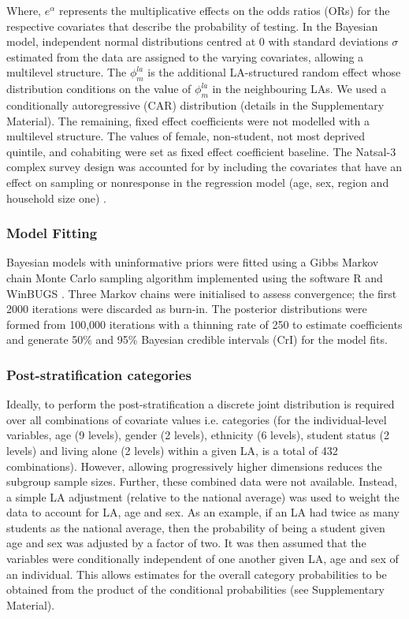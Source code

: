\documentclass[fleqn,10pt]{wlscirep}
\begin{document}
Where, $e^{\alpha}$ represents the multiplicative effects on the odds ratios (ORs) for the respective covariates that describe the probability of testing. In the Bayesian model, independent normal distributions centred at 0 with standard deviations $\sigma$ estimated from the data are assigned to the varying covariates, allowing a multilevel structure. The $\phi_m^{la}$ is the additional LA-structured random effect whose distribution conditions on the value of $\phi_m^{la}$ in the neighbouring LAs. We used a conditionally autoregressive (CAR) distribution (details in the Supplementary Material). The remaining, fixed effect coefficients were not modelled with a multilevel structure. The values of female, non-student, not most deprived quintile, and cohabiting were set as fixed effect coefficient baseline.
The Natsal-3 complex survey design was accounted for by including the covariates that have an effect on sampling or nonresponse in the regression model (age, sex, region and household size one) \cite{Gelman2007}.

\subsubsection*{Model Fitting}
Bayesian models with uninformative priors were fitted using a Gibbs Markov chain Monte Carlo sampling algorithm implemented using the software R \cite{RCoreTeam2017} and WinBUGS \cite{Lunn2000}. Three Markov chains were initialised to assess convergence; the first 2000 iterations were discarded as burn-in. The posterior distributions were formed from 100,000 iterations with a thinning rate of 250 to estimate coefficients and generate 50\% and 95\% Bayesian credible intervals (CrI) for the model fits.

\subsubsection*{Post-stratification categories}
Ideally, to perform the post-stratification a discrete joint distribution is required over all combinations of covariate values i.e. categories (for the individual-level variables, age (9 levels), gender (2 levels), ethnicity (6 levels), student status (2 levels) and living alone (2 levels) within a given LA, is a total of 432 combinations). However, allowing progressively higher dimensions reduces the subgroup sample sizes. Further, these combined data were not available. Instead, a simple LA adjustment (relative to the national average) was used to weight the data to account for LA, age and sex. As an example, if an LA had twice as many students as the national average, then the probability of being a student given age and sex was adjusted by a factor of two.
It was then assumed that the variables were conditionally independent of one another given LA, age and sex of an individual. This allows estimates for the overall category probabilities to be obtained from the product of the conditional probabilities (see Supplementary Material). 
\end{document}
